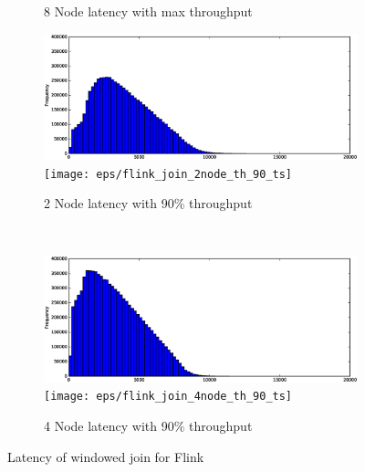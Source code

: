 \begin{figure}
\begin{subfigure}[b]{0.3\textwidth}
        \caption{8 Node latency with max throughput }
    \end{subfigure}




    \begin{subfigure}[b]{0.3\textwidth}
        \includegraphics[width=\textwidth]{eps/flink_join_2node_th_90_hist}
         \texttt{[image: eps/flink\_join\_2node\_th\_90\_ts]}

        \caption{2 Node latency with 90\% throughput }
    \end{subfigure}
    ~ 
    \begin{subfigure}[b]{0.3\textwidth}
        \includegraphics[width=\textwidth]{eps/flink_join_4node_th_90_hist}
         \texttt{[image: eps/flink\_join\_4node\_th\_90\_ts]}

        \caption{4 Node latency with 90\% throughput }
    \end{subfigure}



        \caption{Latency of windowed join for Flink}
\end{figure}